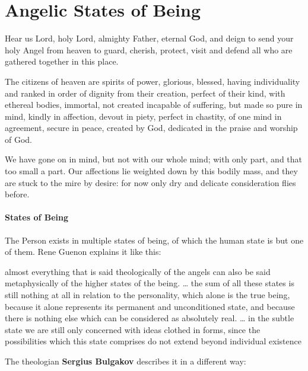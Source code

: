 \section{Angelic States of Being}


\label{sec:AngelicStates}

\begin{quotex}
Hear us Lord, holy Lord, almighty Father, eternal God, and deign to send your holy Angel from heaven to guard, cherish, protect, visit and defend all who are gathered together in this place. 

The citizens of heaven are spirits of power, glorious, blessed, having individuality and ranked in order of dignity from their creation, perfect of their kind, with ethereal bodies, immortal, not created incapable of suffering, but made so pure in mind, kindly in affection, devout in piety, perfect in chastity, of one mind in agreement, secure in peace, created by God, dedicated in the praise and worship of God. 

We have gone on in mind, but not with our whole mind; with only part, and that too small a part. Our affections lie weighted down by this bodily mass, and they are stuck to the mire by desire: for now only dry and delicate consideration flies before. 

\end{quotex}
\paragraph{States of Being}
The Person exists in multiple states of being, of which the human state is but one of them. Rene Guenon explains it like this:

\begin{quotex}
almost everything that is said theologically of the angels can also be said metaphysically of the higher states of the being. … the sum of all these states is still nothing at all in relation to the personality, which alone is the true being, because it alone represents its permanent and unconditioned state, and because there is nothing else which can be considered as absolutely real. … in the subtle state we are still only concerned with ideas clothed in forms, since the possibilities which this state comprises do not extend beyond individual existence 

\end{quotex}
The theologian \textbf{Sergius Bulgakov} describes it in a different way:

